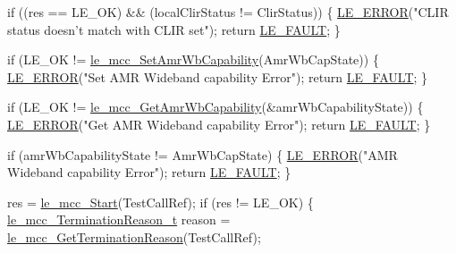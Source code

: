 \begin{DoxyCodeInclude}
{{{{{    \textcolor{keywordflow}{if} ((res == LE\_OK) && (localClirStatus !=  ClirStatus))
    \{
        \hyperlink{le__log_8h_a353590f91b3143a7ba3a416ae5a50c3d}{LE\_ERROR}(\textcolor{stringliteral}{"CLIR status doesn't match with CLIR set"});
        \textcolor{keywordflow}{return} \hyperlink{le__basics_8h_a1cca095ed6ebab24b57a636382a6c86cac409634423b6b1ef09643529f6224798}{LE\_FAULT};
    \}

    \textcolor{keywordflow}{if} (LE\_OK != \hyperlink{le__mcc__interface_8h_ab2df0040963d964f360cb2b7148f9277}{le\_mcc\_SetAmrWbCapability}(AmrWbCapState))
    \{
        \hyperlink{le__log_8h_a353590f91b3143a7ba3a416ae5a50c3d}{LE\_ERROR}(\textcolor{stringliteral}{"Set AMR Wideband capability Error"});
        \textcolor{keywordflow}{return} \hyperlink{le__basics_8h_a1cca095ed6ebab24b57a636382a6c86cac409634423b6b1ef09643529f6224798}{LE\_FAULT};
    \}

    \textcolor{keywordflow}{if} (LE\_OK != \hyperlink{le__mcc__interface_8h_a3762311b9860dc66c52b00f4324dc140}{le\_mcc\_GetAmrWbCapability}(&amrWbCapabilityState))
    \{
        \hyperlink{le__log_8h_a353590f91b3143a7ba3a416ae5a50c3d}{LE\_ERROR}(\textcolor{stringliteral}{"Get AMR Wideband capability Error"});
        \textcolor{keywordflow}{return} \hyperlink{le__basics_8h_a1cca095ed6ebab24b57a636382a6c86cac409634423b6b1ef09643529f6224798}{LE\_FAULT};
    \}

    \textcolor{keywordflow}{if} (amrWbCapabilityState != AmrWbCapState)
    \{
        \hyperlink{le__log_8h_a353590f91b3143a7ba3a416ae5a50c3d}{LE\_ERROR}(\textcolor{stringliteral}{"AMR Wideband capability Error"});
        \textcolor{keywordflow}{return} \hyperlink{le__basics_8h_a1cca095ed6ebab24b57a636382a6c86cac409634423b6b1ef09643529f6224798}{LE\_FAULT};
    \}

    res = \hyperlink{le__mcc__interface_8h_a72a32869bb23864b3e86c606368bed70}{le\_mcc\_Start}(TestCallRef);
    \textcolor{keywordflow}{if} (res != LE\_OK)
    \{
       \hyperlink{le__mcc__interface_8h_abda706f723ba619f9bc460bcc9a4960d}{le\_mcc\_TerminationReason\_t} reason = 
      \hyperlink{le__mcc__interface_8h_ab16921abc02e0569b129f4a7d92bf3c9}{le\_mcc\_GetTerminationReason}(TestCallRef);

}}}}}
\end{DoxyCodeInclude}

